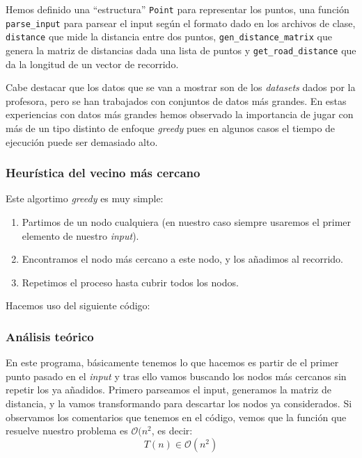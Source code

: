 \documentclass[10pt,a4paper]{article}
\begin{document}


Hemos definido una ``estructura'' \texttt{Point} para representar los puntos, una función \texttt{parse\_input} para parsear el input según el formato dado en los archivos de clase, \texttt{distance} que mide la distancia entre dos puntos, \texttt{gen\_distance\_matrix} que genera la matriz de distancias dada una lista de puntos y \texttt{get\_road\_distance} que da la longitud de un vector de recorrido.

Cabe destacar que los datos que se van a mostrar son de los \textit{datasets} dados por la profesora, pero se han trabajados con conjuntos de datos más grandes. En estas experiencias con datos más grandes hemos observado la importancia de jugar con más de un tipo distinto de enfoque \textit{greedy} pues en algunos casos el tiempo de ejecución puede ser demasiado alto.

\subsubsection{Heurística del vecino más cercano}

Este algortimo \textit{greedy} es muy simple:
\begin{enumerate}
	\item Partimos de un nodo cualquiera (en nuestro caso siempre usaremos el primer elemento de nuestro \textit{input}).
	\item Encontramos el nodo más cercano a este nodo, y los añadimos al recorrido.
	\item Repetimos el proceso hasta cubrir todos los nodos.
\end{enumerate}

Hacemos uso del siguiente código:


\subsubsection*{Análisis teórico}

En este programa, básicamente tenemos lo que hacemos es partir de el primer punto pasado en el \textit{input} y tras ello vamos buscando los nodos más cercanos sin repetir los ya añadidos. Primero parseamos el input, generamos la matriz de distancia, y la vamos transformando para descartar los nodos ya considerados. Si observamos los comentarios que tenemos en el código, vemos que la función que resuelve nuestro problema es \(\mathcal{O}(n^2\), es decir:
\[
	T(n) \in \mathcal{O} (n^2)
\]
\end{document}
